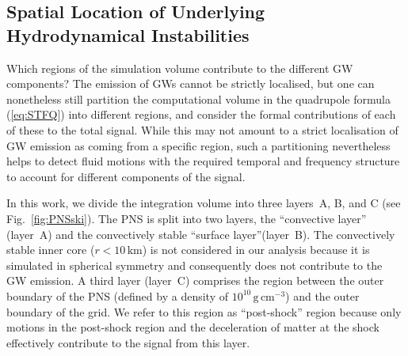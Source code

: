 \subsection{Spatial Location of Underlying Hydrodynamical Instabilities} \label{sec:spaceloc}
Which regions of the simulation volume contribute to the different GW
components? The emission of GWs cannot be strictly
localised, but one can nonetheless still partition the computational volume 
in the quadrupole formula (\ref{eq:STFQ}) into different regions,
and consider the formal contributions of each of these to the total
signal. While this may not amount to a strict localisation
of GW emission as coming from  a specific region, such a partitioning
nevertheless helps to detect fluid motions with the required
temporal and frequency structure to account for different components
of the signal.

In this work, we divide the integration volume into three layers~A, B, and C (see
Fig.~\ref{fig:PNSski}). The PNS is split into two layers, the
``convective layer'' (layer~A) and the convectively stable ``surface layer''(layer~B).  The convectively stable inner core ($r<10 \, \mathrm{km}$) is not considered in our analysis because it is simulated in spherical symmetry and consequently does not contribute to the GW emission.
A third layer (layer~C) comprises the region between the outer boundary
of the PNS (defined by a density of $10^{10} \, \mathrm{g}
\, \mathrm{cm}^{-3}$) and the outer boundary of the grid. We refer
to this region as ``post-shock'' region because
only  motions in the post-shock region and the deceleration of matter
at the shock effectively contribute to the signal from this layer.

